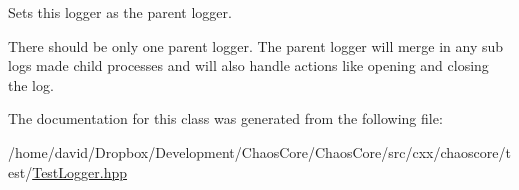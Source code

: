 Sets this logger as the parent logger. 

There should be only one parent logger. The parent logger will merge in any sub logs made child processes and will also handle actions like opening and closing the log. 

The documentation for this class was generated from the following file\-:\begin{DoxyCompactItemize}
\item 
/home/david/\-Dropbox/\-Development/\-Chaos\-Core/\-Chaos\-Core/src/cxx/chaoscore/test/\hyperlink{_test_logger_8hpp}{Test\-Logger.\-hpp}\end{DoxyCompactItemize}
